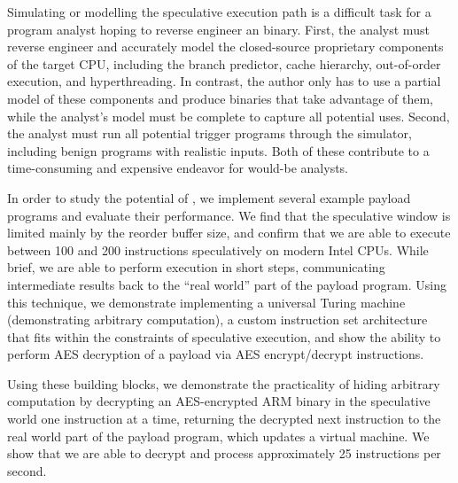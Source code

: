 Simulating or modelling the speculative execution path is a difficult task for a
program analyst hoping to reverse engineer an \speculake binary. First, the
analyst must reverse engineer and accurately model the closed-source proprietary
components of the target CPU, including the branch predictor, cache hierarchy,
out-of-order execution, and hyperthreading. In contrast, the \speculake
author only has to use a partial model of these components and produce binaries
that take advantage of them, while the analyst's model must be complete to
capture all potential \speculake uses. Second, the analyst must run all
potential trigger programs through the simulator, including benign programs with
realistic inputs. Both of these contribute to a time-consuming and expensive
endeavor for would-be analysts.

In order to study the potential of \speculake, we implement several example
payload programs and evaluate their performance.
We find that the speculative window is limited mainly by the reorder buffer
size, and confirm that we are able to execute between 100 and 200 instructions
speculatively on modern Intel CPUs. While brief, we are able to perform
execution in short steps, communicating intermediate results back to the ``real
world'' part of the payload program. Using this technique,
we demonstrate implementing a universal Turing machine
(demonstrating arbitrary computation), a custom instruction set architecture
that fits within the constraints of speculative execution, and show
the ability to perform AES decryption
of a payload via AES encrypt/decrypt instructions. 

Using these building blocks, we demonstrate the practicality of hiding arbitrary
computation by decrypting an AES-encrypted ARM binary in the speculative world
one instruction at a time, returning the decrypted next instruction to the real
world part of the payload program, which updates a virtual machine. We show that
we are able to decrypt and process approximately 25 instructions per second.











